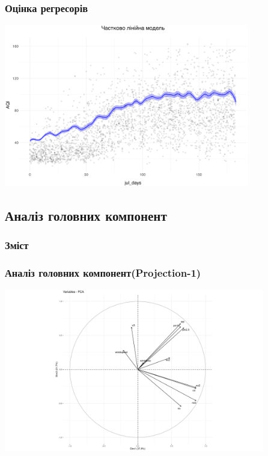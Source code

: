 ﻿\documentclass{beamer}
\begin{document}
\begin{frame}
  \frametitle{Оцінка регресорів}

   \begin{center}
    \includegraphics[height=2.8in]{plots/lab4/nppl.png}
  \end{center}
\end{frame}


\begin{frame}
  \section{Аналіз головних компонент}

  \frametitle{Зміст}
  \tableofcontents[currentsection]
\end{frame}

\begin{frame}
\frametitle{Аналіз головних компонент(Projection-1)}
  \includegraphics[height=2.8in]{plots/lab4/pca/projection-1-2.png}
\end{frame}
\end{document}
